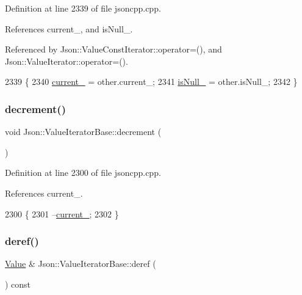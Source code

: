 Definition at line 2339 of file jsoncpp.\+cpp.



References current\+\_\+, and is\+Null\+\_\+.



Referenced by Json\+::\+Value\+Const\+Iterator\+::operator=(), and Json\+::\+Value\+Iterator\+::operator=().


\begin{DoxyCode}
2339                                                   \{
2340   \hyperlink{class_json_1_1_value_iterator_base_ab3138ce8af8301cca3b041ea55cb922a}{current\_} = other.current\_;
2341   \hyperlink{class_json_1_1_value_iterator_base_a3e08b114a1aed9bde518c527f94a8c59}{isNull\_} = other.isNull\_;
2342 \}
\end{DoxyCode}
\mbox{\label{class_json_1_1_value_iterator_base_affc8cf5ff54a9f432cc693362c153fa6}} 
\subsubsection{\texorpdfstring{decrement()}{decrement()}}
{\footnotesize\ttfamily void Json\+::\+Value\+Iterator\+Base\+::decrement (\begin{DoxyParamCaption}{ }\end{DoxyParamCaption})\hspace{0.3cm}{\ttfamily [protected]}}



Definition at line 2300 of file jsoncpp.\+cpp.



References current\+\_\+.


\begin{DoxyCode}
2300                                   \{
2301   --\hyperlink{class_json_1_1_value_iterator_base_ab3138ce8af8301cca3b041ea55cb922a}{current\_};
2302 \}
\end{DoxyCode}
\mbox{\label{class_json_1_1_value_iterator_base_aa5b75c9514a30ba2ea3c9a35c165c18e}} 
\subsubsection{\texorpdfstring{deref()}{deref()}}
{\footnotesize\ttfamily \hyperlink{class_json_1_1_value}{Value} \& Json\+::\+Value\+Iterator\+Base\+::deref (\begin{DoxyParamCaption}{ }\end{DoxyParamCaption}) const\hspace{0.3cm}{\ttfamily [protected]}}



